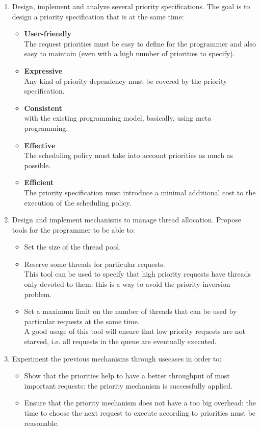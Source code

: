 \documentclass[11pt]{report}
\begin{document}
\begin{enumerate}
\item Design, implement and analyze several priority specifications. The goal is to design a priority specification that is at the same time:
	\begin{itemize}
	\item \textbf{User-friendly} \\The request priorities must be easy to define for the programmer and also easy to maintain (even with a high number of priorities to specify).
	\item \textbf{Expressive} \\Any kind of priority dependency must be covered by the priority specification.
	\item \textbf{Consistent} \\with the existing programming model, basically, using meta programming.
	\item \textbf{Effective} \\The scheduling policy must take into account priorities as much as possible.
	\item \textbf{Efficient} \\The priority specification must introduce a minimal additional cost to the execution of the scheduling policy.
	\end{itemize}
\item Design and implement mechanisms to manage thread allocation. Propose tools for the programmer to be able to:
	\begin{itemize}
	\item Set the size of the thread pool.
	\item Reserve some threads for particular requests. \\This tool can be used to specify that high priority requests have threads only devoted to them: this is a way to avoid the priority inversion problem.
	\item Set a maximum limit on the number of threads that can be used by particular requests at the same time. \\A good usage of this tool will ensure that low priority requests are not starved, i.e. all requests in the queue are eventually executed.
	\end{itemize}
\item Experiment the previous mechanisms through usecases in order to:
	\begin{itemize}
	\item Show that the priorities help to have a better throughput of most important requests: the priority mechanism is successfully applied.
	\item Ensure that the priority mechanism does not have a too big overhead: the time to choose the next request to execute according to priorities must be reasonable.
	\end{itemize}
\end{enumerate}
\end{document}
